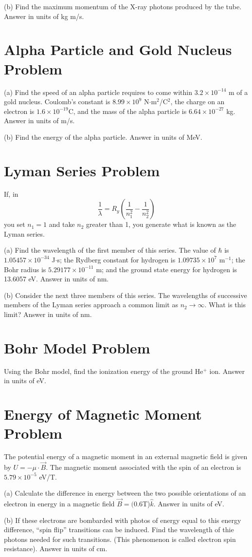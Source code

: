 \documentclass[../physics12.tex]{subfiles}
\begin{document}
(b) Find the maximum momentum of the X-ray photons produced by the tube. Answer in units of kg m/s.

\section{Alpha Particle and Gold Nucleus Problem}
(a) Find the speed of an alpha particle requires to come within $3.2\times 10^{-14}$ m of a gold nucleus. Coulomb's constant is $8.99\times 10^9$ N$\cdot$m$^2$/C$^2$, 
the charge on an electron is $1.6\times 10^{-19}$C, and the mass of the alpha particle is $6.64\times 10^{-27}$ kg. Answer in units of m/s.

(b) Find the energy of the alpha particle. Answer in units of MeV.

\section{Lyman Series Problem}
If, in 
\[ \frac{1}{\lambda} = R_y \left(\frac{1}{n_1^2}-\frac{1}{n_2^2}\right) \]
you set $n_1 = 1$ and take $n_2$ greater than 1, you generate what is known as the Lyman series.

(a) Find the wavelength of the first member of this series. The value of $\hbar$ is $1.05457\times 10^{-34}$ J$\cdot$s; the Rydberg constant for 
hydrogen is $1.09735\times 10^7$ m$^{-1}$; the Bohr radius is $5.29177\times 10^{-11}$ m; and the ground state energy for hydrogen is 13.6057 eV. Answer in units of nm.

(b) Consider the next three members of this series. The wavelengths of successive members of the Lyman series approach a common limit as $n_2 \rightarrow \infty$. What is this limit? Answer in units of nm.

\section{Bohr Model Problem}
Using the Bohr model, find the ionization energy of the ground He$^+$ ion. Answer in units of eV.

\section{Energy of Magnetic Moment Problem}
The potential energy of a magnetic moment in an external magnetic field is given by $U=-\mu\cdot\vec{B}$. The magnetic moment associated with the 
spin of an electron is $5.79\times 10^{-5}$ eV/T. 

(a) Calculate the difference in energy between the two possible orientations of an electron in energy in a magnetic field $\vec{B}=(0.6$T)$\hat{k}$. Answer in units of eV.

(b) If these electrons are bombarded with photos of energy equal to this energy difference, ``spin flip'' transitions can be induced. Find the wavelength 
of thie photons needed for such transitions. (This phenomenon is called electron spin resistance). Answer in units of cm.
\end{document}
